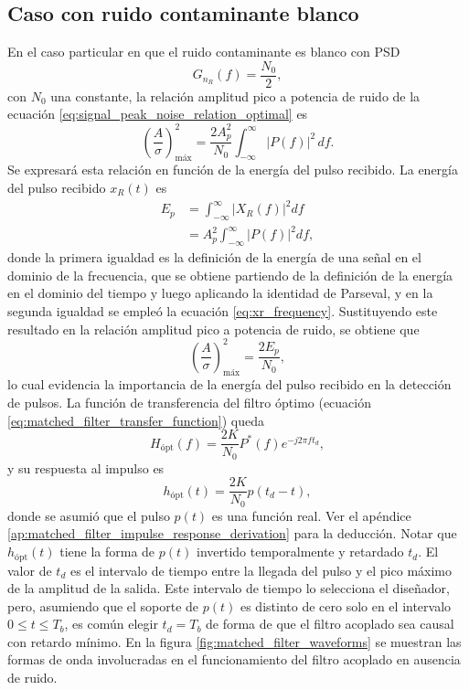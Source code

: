 \documentclass[a4paper]{article}
\begin{document}
\subsection{Caso con ruido contaminante blanco}\label{sec:matching_filter_with_white_noise}

En el caso particular en que el ruido contaminante es blanco con PSD
\[
 G_{n_R}(f)=\frac{N_0}{2},
\]
con \(N_0\) una constante, la relación amplitud pico a potencia de ruido de la ecuación \ref{eq:signal_peak_noise_relation_optimal} es
\[
 \left(\frac{A}{\sigma}\right)_\textrm{máx}^2 = \frac{2A_p^2}{N_0}\int_{-\infty}^{\infty}\left|P(f)\right|^2\,df.
\]
Se expresará esta relación en función de la energía del pulso recibido. La energía del pulso recibido \(x_R(t)\) es
\begin{align*}
 E_p&=\int_{-\infty}^{\infty}\left|X_R(f)\right|^2df\\
   &=A_p^2\int_{-\infty}^{\infty}\left|P(f)\right|^2df,
\end{align*}
donde la primera igualdad es la definición de la energía de una señal en el dominio de la frecuencia, que se obtiene partiendo de la definición de la energía en el dominio del tiempo y luego aplicando la identidad de Parseval, y en la segunda igualdad se empleó la ecuación \ref{eq:xr_frequency}. Sustituyendo este resultado en la relación amplitud pico a potencia de ruido, se obtiene que
\begin{equation}\label{eq:matched_filter_nr_2}
 \left(\frac{A}{\sigma}\right)_\textrm{máx}^2=\frac{2E_p}{N_0},
\end{equation}
lo cual evidencia la importancia de la energía del pulso recibido en la detección de pulsos. La función de transferencia del filtro óptimo (ecuación \ref{eq:matched_filter_transfer_function}) queda
\begin{equation}\label{eq:matched_filter_white_noise_transfer_function}
 H_{\textrm{ópt}}(f) = \frac{2K}{N_0}P^*(f)e^{-j2\pi ft_d},
\end{equation}
y su respuesta al impulso es
\begin{equation}\label{eq:matched_filter_white_noise_impulse_response}
 h_{\textrm{ópt}}(t) = \frac{2K}{N_0}p(t_d-t),
\end{equation}
donde se asumió que el pulso \(p(t)\) es una función real. Ver el apéndice \ref{ap:matched_filter_impulse_response_derivation} para la deducción.
Notar que \(h_{\textrm{ópt}}(t)\) tiene la forma de \(p(t)\) invertido temporalmente y retardado \(t_d\). El valor de \(t_d\) es el intervalo de tiempo entre la llegada del pulso y el pico máximo de la amplitud de la salida. Este intervalo de tiempo lo selecciona el diseñador, pero, asumiendo que el soporte de \(p(t)\) es distinto de cero solo en el intervalo \(0\leq t\leq T_b\), es común elegir \(t_d=T_b\) de forma de que el filtro acoplado sea causal con retardo mínimo. En la figura \ref{fig:matched_filter_waveforms} se muestran las formas de onda involucradas en el funcionamiento del filtro acoplado en ausencia de ruido.
\end{document}
